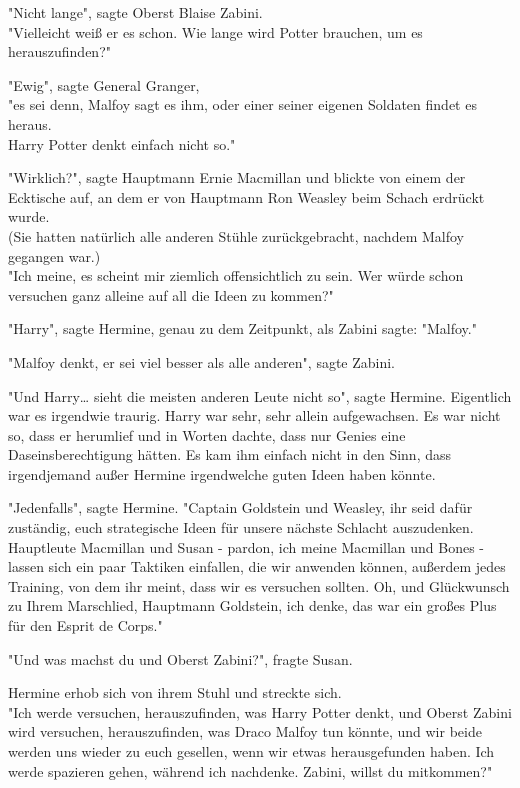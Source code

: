 {"Nicht lange", sagte Oberst Blaise Zabini.\\ "Vielleicht weiß er es schon. Wie lange wird Potter brauchen, um es herauszufinden?"

"Ewig", sagte General Granger,\\ "es sei denn, Malfoy sagt es ihm, oder einer seiner eigenen Soldaten findet es heraus.\\ Harry Potter denkt einfach nicht so."

"Wirklich?", sagte Hauptmann Ernie Macmillan und blickte von einem der Ecktische auf, an dem er von Hauptmann Ron Weasley beim Schach erdrückt wurde.\\ (Sie hatten natürlich alle anderen Stühle zurückgebracht, nachdem Malfoy gegangen war.)\\ "Ich meine, es scheint mir ziemlich offensichtlich zu sein. Wer würde schon versuchen ganz alleine auf all die Ideen zu kommen?"

"Harry", sagte Hermine, genau zu dem Zeitpunkt, als Zabini sagte: "Malfoy."

"Malfoy denkt, er sei viel besser als alle anderen", sagte Zabini.

"Und Harry… sieht die meisten anderen Leute nicht so", sagte Hermine. Eigentlich war es irgendwie traurig. Harry war sehr, sehr allein aufgewachsen. Es war nicht so, dass er herumlief und in Worten dachte, dass nur Genies eine Daseinsberechtigung hätten. Es kam ihm einfach nicht in den Sinn, dass irgendjemand außer Hermine irgendwelche guten Ideen haben könnte.

"Jedenfalls", sagte Hermine. "Captain Goldstein und Weasley, ihr seid dafür zuständig, euch strategische Ideen für unsere nächste Schlacht auszudenken.\\ Hauptleute Macmillan und Susan - pardon, ich meine Macmillan und Bones - lassen sich ein paar Taktiken einfallen, die wir anwenden können, außerdem jedes Training, von dem ihr meint, dass wir es versuchen sollten. Oh, und Glückwunsch zu Ihrem Marschlied, Hauptmann Goldstein, ich denke, das war ein großes Plus für den Esprit de Corps."

"Und was machst du und Oberst Zabini?", fragte Susan.

Hermine erhob sich von ihrem Stuhl und streckte sich.\\ "Ich werde versuchen, herauszufinden, was Harry Potter denkt, und Oberst Zabini wird versuchen, herauszufinden, was Draco Malfoy tun könnte, und wir beide werden uns wieder zu euch gesellen, wenn wir etwas herausgefunden haben. Ich werde spazieren gehen, während ich nachdenke. Zabini, willst du mitkommen?"

}
